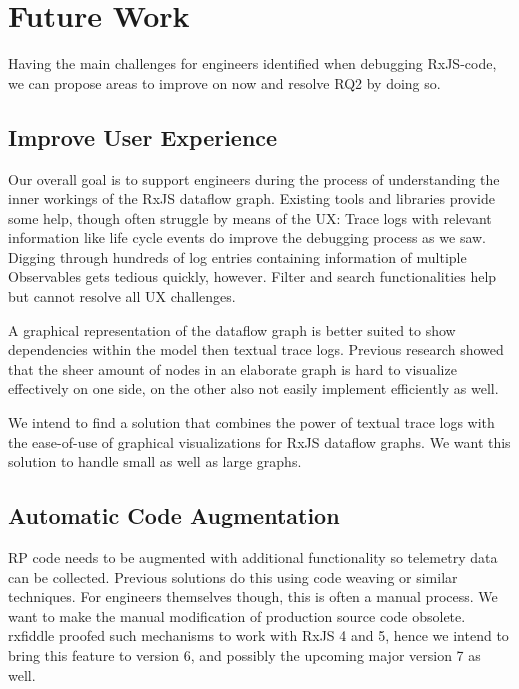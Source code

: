 \documentclass[12pt,a4paper]{article}
\begin{document}
\section{Future Work}
\label{sec:future}

Having the main challenges for engineers identified when debugging RxJS-code, we can propose areas to improve on now and resolve RQ2 by doing so.

\subsection{Improve User Experience}

Our overall goal is to support engineers during the process of understanding the inner workings of the RxJS dataflow graph. Existing tools and libraries provide some help, though often struggle by means of the UX: Trace logs with relevant information like life cycle events do improve the debugging process as we saw. Digging through hundreds of log entries containing information of multiple Observables gets tedious quickly, however. Filter and search functionalities help but cannot resolve all UX challenges.

A graphical representation of the dataflow graph is better suited to show dependencies within the model then textual trace logs. Previous research showed that the sheer amount of nodes in an elaborate graph is hard to visualize effectively \cite{10.1145/3180155.3180156} on one side, on the other also not easily implement efficiently as well.

We intend to find a solution that combines the power of textual trace logs with the ease-of-use of graphical visualizations for RxJS dataflow graphs. We want this solution to handle small as well as large graphs.

\subsection{Automatic Code Augmentation}

RP code needs to be augmented with additional functionality so telemetry data can be collected. Previous solutions do this using code weaving\cite{10.1145/2884781.2884815} or similar techniques\cite{10.1145/3180155.3180156}. For engineers themselves though, this is often a manual process. We want to make the manual modification of production source code obsolete. rxfiddle proofed such mechanisms to work with RxJS 4 and 5, hence we intend to bring this feature to version 6, and possibly the upcoming major version 7 as well.
\end{document}
